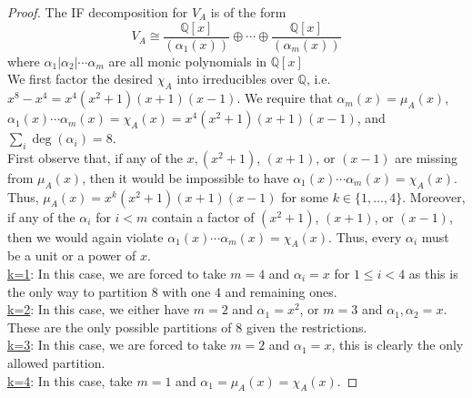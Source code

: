 \documentclass[12pt,letterpaper]{article}
\newcommand{\Q}{\mathbb{Q}\xspace}
\theoremstyle{remark}
\begin{document}
\begin{proof}
  The IF decomposition for $V_A$ is of the form
  \[
    V_A \cong \frac{\Q[x]}{(\alpha_1(x))} \oplus \cdots \oplus \frac{\Q[x]}{(\alpha_m(x))}
  \]
  where $\alpha_1\vert \alpha_2\vert\cdots \alpha_m$ are all monic polynomials in $\Q[x]$\\

  We first factor the desired $\chi_A$ into irreducibles over $\Q$, i.e. $x^8 - x^4 = x^4(x^2+1)(x+1)(x-1)$. We require that $\alpha_m(x) = \mu_A(x)$, $\alpha_1(x)\cdots\alpha_m(x) = \chi_A(x) = x^4(x^2+1)(x+1)(x-1)$, and $\sum_{i}\deg(\alpha_i) = 8$.\\

  First observe that, if any of the $x, (x^2+1)$, $(x+1)$, or $(x-1)$ are missing from $\mu_A(x)$, then it would be impossible to have $\alpha_1(x)\cdots\alpha_m(x) = \chi_A(x)$. Thus, $\mu_A(x) = x^k(x^2+1)(x+1)(x-1)$ for some $k\in\{1,\ldots,4\}$. Moreover, if any of the $\alpha_i$ for $i<m$ contain a factor of $(x^2+1)$, $(x+1)$, or $(x-1)$, then we would again violate $\alpha_1(x)\cdots\alpha_m(x) = \chi_A(x)$. Thus, every $\alpha_i$ must be a unit or a power of $x$. \\

  \underline{k=1}: In this case, we are forced to take $m=4$ and $\alpha_i = x$ for $1\leq i <4$ as this is the only way to partition 8 with one 4 and remaining ones.\\

  \underline{k=2}: In this case, we either have $m=2$ and $\alpha_1 = x^2$, or $m=3$ and $\alpha_1,\alpha_2 = x$. These are the only possible partitions of 8 given the restrictions.\\

  \underline{k=3}: In this case, we are forced to take $m=2$ and $\alpha_1 = x$, this is clearly the only allowed partition.\\

  \underline{k=4}: In this case, take $m=1$ and $\alpha_1 = \mu_A(x) = \chi_A(x)$.

\end{proof}
\end{document}
